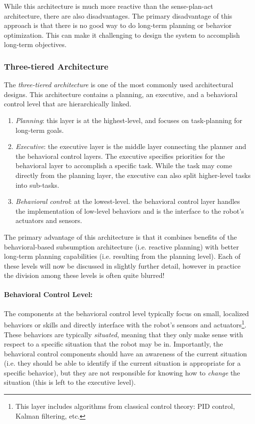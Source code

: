 While this architecture is much more reactive than the sense-plan-act architecture, there are also disadvantages.
The primary disadvantage of this approach is that there is no good way to do long-term planning or behavior optimization. This can make it challenging to design the system to accomplish long-term objectives.

\subsubsection{Three-tiered Architecture}
The \textit{three-tiered architecture} is one of the most commonly used architectural designs. This architecture contains a planning, an executive, and a behavioral control level that are hierarchically linked. 
\begin{enumerate}
    \item \textit{Planning}: this layer is at the highest-level, and focuses on task-planning for long-term goals.
    \item \textit{Executive}: the executive layer is the middle layer connecting the planner and the behavioral control layers. The executive specifies priorities for the behavioral layer to accomplish a specific task. While the task may come directly from the planning layer, the executive can also split higher-level tasks into sub-tasks.
    \item \textit{Behavioral control}: at the lowest-level. the behavioral control layer handles the implementation of low-level behaviors and is the interface to the robot's actuators and sensors.
\end{enumerate}
The primary advantage of this architecture is that it combines benefits of the behavioral-based subsumption architecture (i.e. reactive planning) with better long-term planning capabilities (i.e. resulting from the planning level). Each of these levels will now be discussed in slightly further detail, however in practice the division among these levels is often quite blurred!

\paragraph{Behavioral Control Level:}
The components at the behavioral control level typically focus on small, localized behaviors or skills and directly interface with the robot's sensors and actuators\footnote{This layer includes algorithms from classical control theory: PID control, Kalman filtering, etc.}. These behaviors are typically \textit{situated}, meaning that they only make sense with respect to a specific situation that the robot may be in. Importantly, the behavioral control components should have an awareness of the current situation (i.e. they should be able to identify if the current situation is appropriate for a specific behavior), but they are not responsible for knowing how to \textit{change} the situation (this is left to the executive level). 

